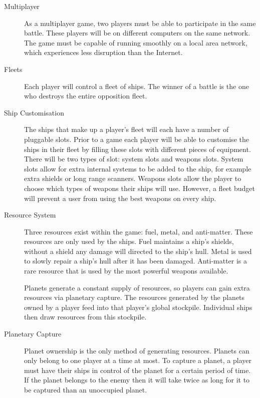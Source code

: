 \begin{description}

	\item[Multiplayer]

	As a multiplayer game, two players must be able to participate in the same battle. These
	players will be on different computers on the same network. The game must be capable of running
	smoothly on a local area network, which experiences less disruption than the Internet.

	\item[Fleets]

	Each player will control a fleet of ships. The winner of a battle is the one who destroys
	the entire opposition fleet.

	\item[Ship Customisation]

	The ships that make up a player's fleet will each have a number of pluggable slots.
	Prior to a game each player will be able to customise the ships in their fleet by filling
	these slots with different pieces of equipment.
	There will be two types of slot: system slots and weapons slots. System slots allow for extra
	internal systems to be added to the ship, for example extra shields or long range scanners.
	Weapons slots allow the player to choose which types of weapons their ships will use. However,
	a fleet budget will prevent a user from using the best weapons on every ship.

	\item[Resource System]

	Three resources exist within the game: fuel, metal, and anti-matter. These resources are only
	used by the ships. Fuel maintains a ship's shields, without a shield any damage will directed
	to the ship's hull. Metal is used to slowly repair a ship's hull after it has been damaged.
	Anti-matter is a rare resource that is used by the most powerful weapons available.

	Planets generate a constant supply of resources, so players can gain extra resources via
	planetary capture. The resources generated by the planets owned by a player feed into that
	player's global stockpile. Individual ships then draw resources from this stockpile.


	\item[Planetary Capture]

	Planet ownership is the only method of generating resources. Planets can only belong to
	one player at a time at most. To capture a planet, a player must have their ships in control
	of the planet for a certain period of time. If the planet belongs to the enemy then it will
	take twice as long for it to be captured than an unoccupied planet.


\end{description}
